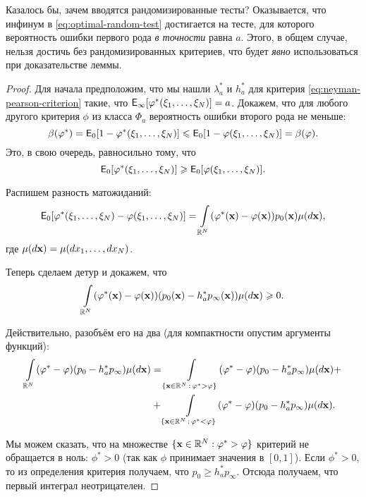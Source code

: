 Казалось бы, зачем вводятся рандомизированные тесты? Оказывается, что инфинум в 
\eqref{eq:optimal-random-test} достигается на тесте, для которого вероятность 
ошибки первого рода \emph{в точности} равна \(a\). Этого, в общем случае, 
нельзя достичь без рандомизированных критериев, что будет \emph{явно} 
использоваться при доказательстве леммы.
\begin{proof}
	Для начала предположим, что мы нашли \(\lambda_{a}^{*}\) и \(h_{a}^{*}\) 
	для критерия \eqref{eq:neyman-pearson-criterion} такие, что 
	\(\E_{\infty}[\phi^{*}(\xi_{1}, \ldots, \xi_{N})] = a\). Докажем, что для 
	любого другого критерия \(\phi\) из класса \(\Phi_{a}\) вероятность ошибки 
	второго рода не меньше:
	\begin{equation}\label{eq:neyman-pearson-error-inequality}
		\beta(\phi^{*}) = \E_{0}[1 - \phi^{*}(\xi_{1}, \ldots, \xi_{N})] \leq 
		\E_{0}[1 - \phi(\xi_{1}, \ldots, \xi_{N})] = \beta(\phi).
	\end{equation}
	Это, в свою очередь, равносильно тому, что 
	\[
		\E_{0}[\phi^{*}(\xi_{1}, \ldots, \xi_{N})] \geq \E_{0}[\phi(\xi_{1}, 
		\ldots, \xi_{N})].
	\]
	
	Распишем разность матожиданий:
	\[
		\E_{0}[\phi^{*}(\xi_{1}, \ldots, \xi_{N}) - \phi(\xi_{1}, 
		\ldots, \xi_{N})] = \int\limits_{\R^{N}} (\phi^{*}(\mathbf{x}) - 
		\phi(\mathbf{x}))p_{0}(\mathbf{x})\mu(\diff \mathbf{x}),
	\]
	где \(\mu(\mathop{}\!d \mathbf{x}) = \mu(\mathop{}\!d x_{1}, \ldots, \mathop{}\!d x_{N})\).
	
	Теперь сделаем детур и докажем, что
	\begin{equation}\label{neyman-pearson-inequality-2}
		\int\limits_{\mathbb{R}^{N}} (\varphi^{*}(\mathbf{x}) - \varphi(\mathbf{x})) 
		(p_{0}(\mathbf{x}) - h_{a}^{*}p_{\infty}(\mathbf{x}))\mu(\mathop{}\!d 
		\mathbf{x}) \geqslant 0.
	\end{equation}
	
	Действительно, разобъём его на два (для компактности опустим аргументы 
	функций):
	\begin{align*}
		\int\limits_{\mathbb{R}^{N}} (\varphi^{*} - \varphi)(p_{0} - h_{a}^{*}p_{\infty}) 
		\mu(\mathop{}\!d \mathbf{x}) &= \int\limits_{\{\mathbf{x} \in 
		\mathbb{R}^{N}\,:\,\varphi^{*} > \varphi\}} (\varphi^{*} - \varphi)(p_{0} - 
		h_{a}^{*}p_{\infty}) \mu(\mathop{}\!d \mathbf{x}) + \\
		&+ \int\limits_{\{\mathbf{x} \in \mathbb{R}^{N}\,:\,\varphi^{*} < \varphi\}} 
		(\varphi^{*} - \varphi)(p_{0} - h_{a}^{*}p_{\infty}) \mu(\mathop{}\!d \mathbf{x}).
	\end{align*}
	
	Мы можем сказать, что на множестве \(\{\mathbf{x} \in \mathbb{R}^{N} : \varphi^{*} > 
	\varphi\}\) критерий не обращается в ноль: \(\phi^{*} > 0\) (так как \(\phi\) 
	принимает значения в \([0, 1]\)). Если \(\phi^{*} > 0\), то из определения 
	критерия получаем, что \(p_{0} \geq h_{a}^{*}p_{\infty}\). Отсюда получаем, 
	что первый интеграл неотрицателен.
	

\end{proof}
